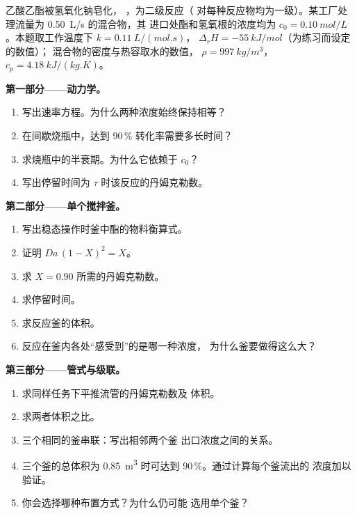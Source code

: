 \begin{problem}
\label{pb:b2:continuous-reactors:1}
乙酸乙酯被氢氧化钠皂化，
，为二级反应（
对每种反应物均为一级）。某工厂处理流量为 \qty{0.50}{L/s} 的混合物，其
进口处酯和氢氧根的浓度均为 $c_0 =
\qty{0.10}{mol/L}$。本题取工作温度下 $k = \qty{0.11}{L/(mol.s)}$，
$\Delta_r H = \qty{-55}{kJ/mol}$（为练习而设定的数值）；
混合物的密度与热容取水的数值，
$\rho = \qty{997}{kg/m^3}$，$c_p = \qty{4.18}{kJ/(kg.K)}$。

\medskip
\noindent\textbf{第一部分——动力学。}
\begin{enumerate}
  \item 写出速率方程。为什么两种浓度始终保持相等？
  \item 在间歇烧瓶中，达到 90\,\% 转化率需要多长时间？
  \item 求烧瓶中的半衰期。为什么它依赖于 $c_0$？
  \item 写出停留时间为 $\tau$ 时该反应的丹姆克勒数。
\end{enumerate}

\medskip
\noindent\textbf{第二部分——单个搅拌釜。}
\begin{enumerate}[resume]
  \item 写出稳态操作时釜中酯的物料衡算式。
  \item 证明 $Da\,(1 - X)^2 = X$。
  \item 求 $X = 0.90$ 所需的丹姆克勒数。
  \item 求停留时间。
  \item 求反应釜的体积。
  \item 反应在釜内各处“感受到”的是哪一种浓度，
        为什么釜要做得这么大？
\end{enumerate}

\medskip
\noindent\textbf{第三部分——管式与级联。}
\begin{enumerate}[resume]
  \item 求同样任务下平推流管的丹姆克勒数及
        体积。
  \item 求两者体积之比。
  \item 三个相同的釜串联：写出相邻两个釜
        出口浓度之间的关系。
  \item 三个釜的总体积为
        \qty{0.85}{m^3} 时可达到 90\,\%。通过计算每个釜流出的
        浓度加以验证。
  \item 你会选择哪种布置方式？为什么仍可能
        选用单个釜？
\end{enumerate}


\end{problem}
